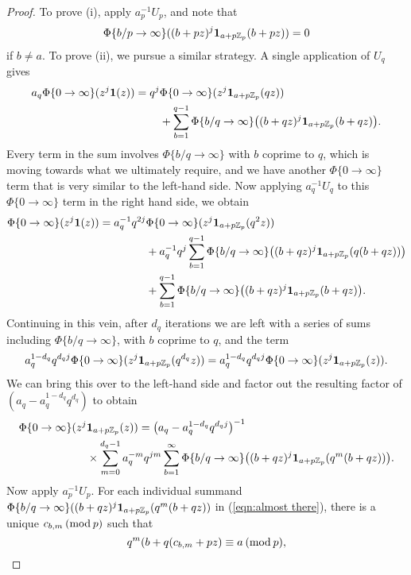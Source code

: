 \documentclass[a4paper,10pt]{article}
\numberwithin{equation}{section}
\begin{document}
\begin{proof}
To prove (i), apply $a_p^{-1}U_p$, and note that 
\[
 \Phi\{b/p \rightarrow \infty\}((b+pz)^j\mathbf{1}_{a+p\mathbb{Z}_p}(b+pz)) = 0
\]
if $b \neq a$. To prove (ii), we pursue a similar strategy. A single application of $U_q$ gives
\begin{align*}
 a_q\Phi\{0\rightarrow\infty\}(z^j\mathbf{1}(z)) = q^j&\Phi\{0\rightarrow\infty\}(z^j\mathbf{1}_{a+p\mathbb{Z}_p}(qz)) \\
&+ \sum_{b = 1}^{q-1}\Phi\{b/q \rightarrow \infty\}\big((b+qz)^j\mathbf{1}_{a+p\mathbb{Z}_p}(b+qz)\big).
\end{align*}
Every term in the sum involves $\Phi\{b/q\rightarrow \infty\}$ with $b$ coprime to $q$, which is moving towards what we ultimately require, and we have another $\Phi\{0\rightarrow\infty\}$ term that is very similar to the left-hand side. Now applying $a_q^{-1}U_q$ to this $\Phi\{0\rightarrow\infty\}$ term in the right hand side, we obtain 
\begin{align*}
 \Phi\{0\rightarrow\infty\}(z^j\mathbf{1}(z)) = a_q^{-1}q^{2j}&\Phi\{0\rightarrow\infty\}(z^j\mathbf{1}_{a+p\mathbb{Z}_p}(q^2z)) \\
&+ a_q^{-1}q^j\sum_{b = 1}^{q-1}\Phi\{b/q \rightarrow \infty\}\big((b+qz)^j\mathbf{1}_{a+p\mathbb{Z}_p}(q(b+qz))\big)\\
&+ \sum_{b = 1}^{q-1}\Phi\{b/q \rightarrow \infty\}\big((b+qz)^j\mathbf{1}_{a+p\mathbb{Z}_p}(b+qz)\big).
\end{align*}
Continuing in this vein, after $d_q$ iterations we are left with a series of sums including $\Phi\{b/q\rightarrow\infty\}$, with $b$ coprime to $q$, and the term
\[
 a_q^{1-d_q}q^{d_qj}\Phi\{0\rightarrow\infty\}(z^j\mathbf{1}_{a+p\mathbb{Z}_p}(q^{d_q}z)) = 
 a_q^{1-d_q}q^{d_qj}\Phi\{0\rightarrow\infty\}(z^j\mathbf{1}_{a+p\mathbb{Z}_p}(z)).
\]
We can bring this over to the left-hand side and factor out the resulting factor of $(a_q - a_q^{1-d_q}q^{d_q})$ to obtain 
\begin{align}\label{eqn:almost there}
\Phi\{0\rightarrow\infty\}(z^j &\mathbf{1}_{a+p\mathbb{Z}_p}(z)) =
\big(a_q -a_q^{1-d_q}q^{d_qj}\big)^{-1}\\\
&\times \sum_{m = 0}^{d_q-1} a_q^{-m}q^{jm}
\sum_{b=1}^\infty \Phi\{b/q\rightarrow \infty\}\big((b + qz)^j\mathbf{1}_{a+p\mathbb{Z}_p}(q^{m}(b+qz))\big).
\end{align}
Now apply $a_p^{-1}U_p$. For each individual summand $\Phi\{b/q \rightarrow \infty\}((b+qz)^j\mathbf{1}_{a+p\mathbb{Z}_p}(q^{m}(b+qz))$ in (\ref{eqn:almost there}), there is a unique $c_{b,m} \hspace{2pt}(\mathrm{mod}\hspace{2pt}p)$ such that 
\[
 q^m(b + q(c_{b,m}+pz) \equiv a \hspace{2pt}(\mathrm{mod}\hspace{2pt}p),
\]
\end{proof}
\end{document}

